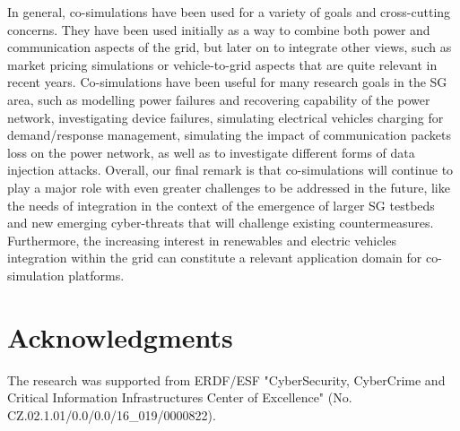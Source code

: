 \documentclass[1p]{elsarticle} %
\begin{document}
In general, co-simulations have been used for a variety of goals and cross-cutting concerns. They have been used initially as a way to combine both power and communication aspects of the grid, but later on to integrate other views, such as market pricing simulations or vehicle-to-grid aspects that are quite relevant in recent years. Co-simulations have been useful for many research goals in the SG area, such as modelling power failures and recovering capability of the power network, investigating device failures, simulating electrical vehicles charging for demand/response management, simulating the impact of communication packets loss on the power network, as well as to investigate different forms of data injection attacks. Overall, our final remark is that co-simulations will continue to play a major role with even greater challenges to be addressed in the future, like the needs of integration in the context of the emergence of larger SG testbeds and new emerging cyber-threats that will challenge existing countermeasures. Furthermore, the increasing interest in renewables and electric vehicles integration within the grid can constitute a relevant application domain for co-simulation platforms.

\section*{Acknowledgments}
The research was supported from ERDF/ESF "CyberSecurity, CyberCrime and Critical Information Infrastructures Center of Excellence" (No. CZ.02.1.01/0.0/0.0/16\_019/0000822).

 
\end{document}
